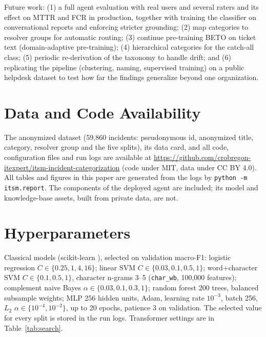 \documentclass[conference]{IEEEtran}
\begin{document}
Future work: (1) a full agent evaluation with real users and several raters and its effect on MTTR and FCR in
production, together with training the classifier on conversational reports and enforcing stricter grounding; (2) map
categories to resolver groups for automatic routing; (3) continue pre-training BETO on ticket text
(domain-adaptive pre-training); (4) hierarchical categories for the catch-all class; (5) periodic
re-derivation of the taxonomy to handle drift; and (6) replicating the pipeline (clustering, naming, supervised
training) on a public helpdesk dataset to test how far the findings generalize beyond one organization.

\section*{Data and Code Availability}
The anonymized dataset (59,860 incidents: pseudonymous id, anonymized title, category, resolver group and the
five splits), its data card, and all code, configuration files and run logs are available at
\url{https://github.com/crobregon-itexpert/itsm-incident-categorization} (code under MIT, data under CC BY 4.0).
All tables and figures in this paper are generated from the logs by \texttt{python -m itsm.report}. The
components of the deployed agent are included; its model and knowledge-base assets, built from private data, are
not.

\appendices
\section{Hyperparameters}\label{app:hp}
Classical models (scikit-learn \cite{pedregosa2011}), selected on validation macro-F1: logistic regression
$C\in\{0.25,1,4,16\}$; linear SVM $C\in\{0.03,0.1,0.5,1\}$; word+character SVM $C\in\{0.1,0.5,1\}$, character
n-grams 3--5 (\texttt{char\_wb}, 100,000 features); complement naive Bayes $\alpha\in\{0.03,0.1,0.3,1\}$;
random forest 200 trees, balanced subsample weights; MLP 256 hidden units, Adam, learning rate $10^{-3}$, batch
256, $L_2$ $\alpha\in\{10^{-4},10^{-2}\}$, up to 20 epochs, patience 3 on validation. The selected value for
every split is stored in the run logs. Transformer settings are in Table~\ref{tab:search}.



\end{document}
